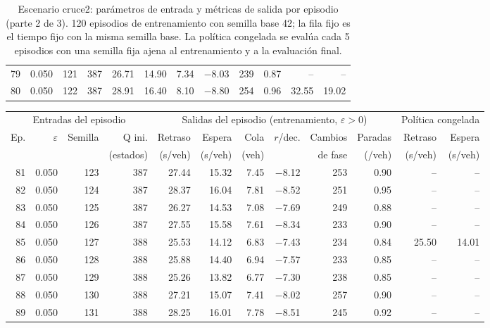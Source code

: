 \begin{table}[H]
\begin{tabular}{rrrrrrrrrrrr}
79 & 0.050 & 121 & 387 & 26.71 & 14.90 & 7.34 & $-$8.03 & 239 & 0.87 & -- & -- \\
80 & 0.050 & 122 & 387 & 28.91 & 16.40 & 8.10 & $-$8.80 & 254 & 0.96 & 32.55 & 19.02 \\
\bottomrule
\end{tabular}
\caption[Escenario cruce2: episodios de entrenamiento (parte 2 de 3)]{Escenario cruce2: parámetros de entrada y métricas de salida por episodio (parte 2 de 3). 120 episodios de entrenamiento con semilla base 42; la fila fijo es el tiempo fijo con la misma semilla base. La política congelada se evalúa cada 5 episodios con una semilla fija ajena al entrenamiento y a la evaluación final.}
\label{tab:cruce2-episodios-2}
\end{table}

\begin{table}[H]
\centering
\scriptsize
\setlength{\tabcolsep}{3pt}
\begin{tabular}{rrrrrrrrrrrr}
\toprule
\multicolumn{4}{c}{Entradas del episodio} & \multicolumn{6}{c}{Salidas del episodio (entrenamiento, $\varepsilon>0$)} & \multicolumn{2}{c}{Política congelada} \\
\cmidrule(lr){1-4}\cmidrule(lr){5-10}\cmidrule(lr){11-12}
Ep. & $\varepsilon$ & Semilla & Q ini. & Retraso & Espera & Cola & $r$/dec. & Cambios & Paradas & Retraso & Espera \\
 &  &  & (estados) & (s/veh) & (s/veh) & (veh) &  & de fase & (/veh) & (s/veh) & (s/veh) \\
\midrule
81 & 0.050 & 123 & 387 & 27.44 & 15.32 & 7.45 & $-$8.12 & 253 & 0.90 & -- & -- \\
82 & 0.050 & 124 & 387 & 28.37 & 16.04 & 7.81 & $-$8.52 & 251 & 0.95 & -- & -- \\
83 & 0.050 & 125 & 387 & 26.27 & 14.53 & 7.08 & $-$7.69 & 249 & 0.88 & -- & -- \\
84 & 0.050 & 126 & 387 & 27.55 & 15.58 & 7.61 & $-$8.34 & 233 & 0.90 & -- & -- \\
85 & 0.050 & 127 & 388 & 25.53 & 14.12 & 6.83 & $-$7.43 & 234 & 0.84 & 25.50 & 14.01 \\
86 & 0.050 & 128 & 388 & 25.88 & 14.40 & 6.94 & $-$7.57 & 233 & 0.85 & -- & -- \\
87 & 0.050 & 129 & 388 & 25.26 & 13.82 & 6.77 & $-$7.30 & 238 & 0.85 & -- & -- \\
88 & 0.050 & 130 & 388 & 27.21 & 15.07 & 7.41 & $-$8.02 & 257 & 0.90 & -- & -- \\
89 & 0.050 & 131 & 388 & 28.25 & 16.01 & 7.78 & $-$8.51 & 245 & 0.92 & -- & -- \\

\end{tabular}
\end{table}
